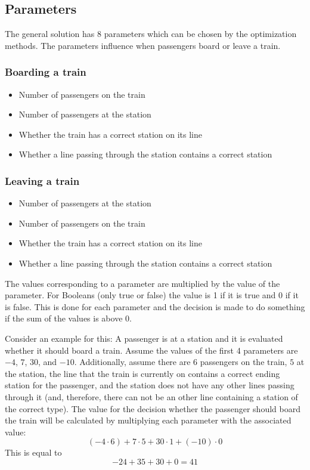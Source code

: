 \documentclass[10pt]{scrreprt}
\begin{document}
\subsection{Parameters}

The general solution has 8 parameters which can be chosen by the optimization methods. The parameters influence when passengers board or leave a train.

\subsubsection{Boarding a train}
\begin{itemize}
    \item Number of passengers on the train
    \item Number of passengers at the station
    \item Whether the train has a correct station on its line
    \item Whether a line passing through the station contains a correct station
\end{itemize}

\subsubsection{Leaving a train}
\begin{itemize}
    \item Number of passengers at the station
    \item Number of passengers on the train
    \item Whether the train has a correct station on its line
    \item Whether a line passing through the station contains a correct station
\end{itemize}

The values corresponding to a parameter are multiplied by the value of the parameter. For Booleans (only true or false) the value is 1 if it is true and 0 if it is false.  This is done for each parameter and the decision is made to do something if the sum of the values is above 0.

Consider an example for this: A passenger is at a station and it is evaluated whether it should board a train. Assume the values of the first 4 parameters are $-4$, $7$, $30$, and $-10$. Additionally, assume there are $6$ passengers on the train, $5$ at the station, the line that the train is currently on contains a correct ending station for the passenger, and the station does not have any other lines passing through it (and, therefore, there can not be an other line containing a station of the correct type). The value for the decision whether the passenger should board the train will be calculated by multiplying each parameter with the associated value:
\begin{equation}
    (-4 \cdot 6) + 7 \cdot 5 + 30 \cdot 1 + (-10) \cdot 0
\end{equation}
This is equal to
\begin{equation}
    -24 + 35 + 30 + 0 = 41
\end{equation}
\end{document}
